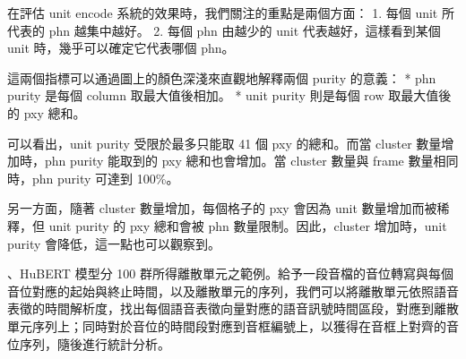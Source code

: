 在評估 unit encode 系統的效果時，我們關注的重點是兩個方面：
1. 每個 unit 所代表的 phn 越集中越好。
2. 每個 phn 由越少的 unit 代表越好，這樣看到某個 unit 時，幾乎可以確定它代表哪個 phn。

這兩個指標可以通過圖上的顏色深淺來直觀地解釋兩個 purity 的意義：
* phn purity 是每個 column 取最大值後相加。
* unit purity 則是每個 row 取最大值後的 pxy 總和。

可以看出，unit purity 受限於最多只能取 41 個 pxy 的總和。而當 cluster 數量增加時，phn purity 能取到的 pxy 總和也會增加。當 cluster 數量與 frame 數量相同時，phn purity 可達到 100\%。

另一方面，隨著 cluster 數量增加，每個格子的 pxy 會因為 unit 數量增加而被稀釋，但 unit purity 的 pxy 總和會被 phn 數量限制。因此，cluster 增加時，unit purity 會降低，這一點也可以觀察到。



        
        、HuBERT 模型分 100 群所得離散單元之範例。給予一段音檔的音位轉寫與每個音位對應的起始與終止時間，以及離散單元的序列，我們可以將離散單元依照語音表徵的時間解析度，找出每個語音表徵向量對應的語音訊號時間區段，對應到離散單元序列上；同時對於音位的時間段對應到音框編號上，以獲得在音框上對齊的音位序列，隨後進行統計分析。